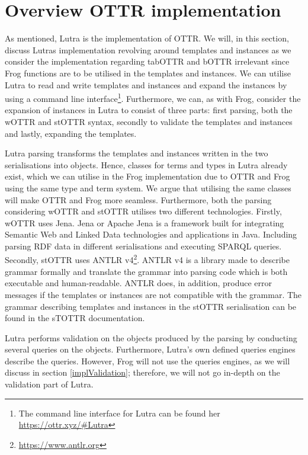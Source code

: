 \section{Overview OTTR implementation}
As mentioned, Lutra is the implementation of OTTR. We will, in this section, discuss Lutras implementation revolving around templates and instances as we consider the implementation regarding tabOTTR and bOTTR irrelevant since Frog functions are to be utilised in the templates and instances. We can utilise Lutra to read and write templates and instances and expand the instances by using a command line interface\footnote{The command line interface for Lutra can be found her \url{https://ottr.xyz/\#Lutra}}. Furthermore, we can, as with Frog, consider the expansion of instances in Lutra to consist of three parts: first parsing, both the wOTTR and stOTTR syntax, secondly to validate the templates and instances and lastly, expanding the templates.

\para
Lutra parsing transforms the templates and instances written in the two serialisations into objects. Hence, classes for terms and types in Lutra already exist, which we can utilise in the Frog implementation due to OTTR and Frog using the same type and term system. We argue that utilising the same classes will make OTTR and Frog more seamless. Furthermore, both the parsing considering wOTTR and stOTTR utilises two different technologies. Firstly, wOTTR uses Jena. Jena or Apache Jena is a framework built for integrating Semantic Web and Linked Data technologies and applications in Java. Including parsing RDF data in different serialisations and executing SPARQL queries\cite{apache_jena}. Secondly, stOTTR uses ANTLR v4\footnote{\url{https://www.antlr.org}}. ANTLR v4 is a library made to describe grammar formally and translate the grammar into parsing code which is both executable and human-readable\cite{antlr4Book}. ANTLR does, in addition, produce error messages if the templates or instances are not compatible with the grammar. The grammar describing templates and instances in the stOTTR serialisation can be found in the sTOTTR documentation\cite{OTTR_stOTTR}.

\para
Lutra performs validation on the objects produced by the parsing by conducting several queries on the objects. Furthermore, Lutra's own defined queries engines describe the queries. However, Frog will not use the queries engines, as we will discuss in section \ref{implValidation}; therefore, we will not go in-depth on the validation part of Lutra. 


